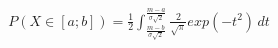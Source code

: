 \documentclass[preview]{standalone}
\begin{document}
\begin{align*}
{P( X \in [a;b] ) = { \frac{1}{2}} } \int_{ \frac{m - b}{\sigma \sqrt{2}} }^{ \frac{m - a}{\sigma \sqrt{2}} } { { \frac{2}{\sqrt{\pi}} } exp( -t^2 ) } \, dt
\end{align*}
\end{document}

